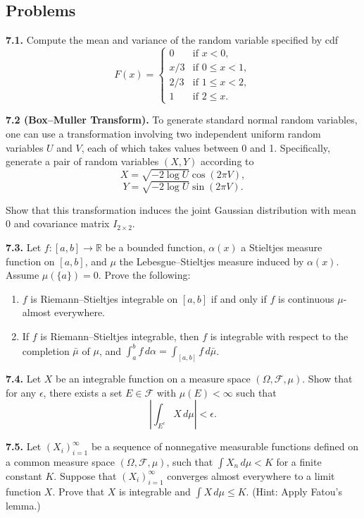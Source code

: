 \subsection*{Problems}

\textbf{7.1.} Compute the mean and variance of the random variable specified by cdf
\[
F(x)=
\begin{cases}
0 & \text{if } x<0,\\
x/3 & \text{if } 0\le x<1,\\
2/3 & \text{if } 1\le x<2,\\
1 & \text{if } 2\le x.
\end{cases}
\]

\textbf{7.2 (Box--Muller Transform).} To generate standard normal random variables, one can use a transformation involving two independent uniform random variables $U$ and $V$, each of which takes values between 0 and 1. Specifically, generate a pair of random variables $(X,Y)$ according to
\[
X=\sqrt{-2\log U}\cos(2\pi V),
\]
\[
Y=\sqrt{-2\log U}\sin(2\pi V).
\]

Show that this transformation induces the joint Gaussian distribution with mean 0 and covariance matrix $I_{2\times 2}$.

\textbf{7.3.} Let $f:[a,b]\to \mathbb{R}$ be a bounded function, $\alpha(x)$ a Stieltjes measure function on $[a,b]$, and $\mu$ the Lebesgue--Stieltjes measure induced by $\alpha(x)$. Assume $\mu(\{a\})=0$. Prove the following:
\begin{enumerate}[label=(\alph*)]
    \item $f$ is Riemann--Stieltjes integrable on $[a,b]$ if and only if $f$ is continuous $\mu$-almost everywhere.
    \item If $f$ is Riemann--Stieltjes integrable, then $f$ is integrable with respect to the completion $\bar{\mu}$ of $\mu$, and $\int_a^b f\, d\alpha = \int_{[a,b]} f\, d\bar{\mu}$.
\end{enumerate}

\textbf{7.4.} Let $X$ be an integrable function on a measure space $(\Omega,\mathcal{F},\mu)$. Show that for any $\epsilon$, there exists a set $E\in \mathcal{F}$ with $\mu(E)<\infty$ such that
\[
\left|\int_{E^c} X\, d\mu\right|<\epsilon.
\]

\textbf{7.5.} Let $(X_i)_{i=1}^{\infty}$ be a sequence of nonnegative measurable functions defined on a common measure space $(\Omega,\mathcal{F},\mu)$, such that $\int X_n\, d\mu < K$ for a finite constant $K$. Suppose that $(X_i)_{i=1}^{\infty}$ converges almost everywhere to a limit function $X$. Prove that $X$ is integrable and $\int X\, d\mu \le K$. (Hint: Apply Fatou's lemma.)

